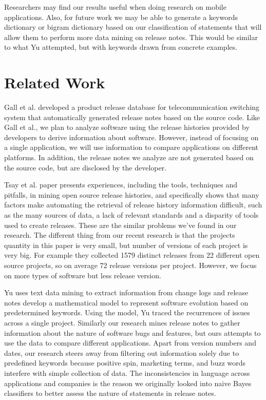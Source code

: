 \documentclass{acm_proc_article-sp}
\begin{document}
 Researchers may find our results useful when doing research on mobile applications.
Also, for future work we may be able to generate a keywords dictionary or bigram dictionary based on our classification of statements that will allow them to perform more data mining on release notes.
This would be similar to what Yu \cite{YuChangeLogs} attempted, but with keywords drawn from concrete examples.


\section{Related Work}

Gall et al. \cite{GallSoftwareEv} developed a product release database for telecommunication switching system that automatically generated release notes based on the source code.
Like Gall et al., we plan to analyze software using the release histories provided by developers to derive information about software. 
However, instead of focusing on a single application, we will use information to compare applications on different platforms. 
In addition, the release notes we analyze are not generated based on the source code, but are disclosed by the developer.

Tsay et al. \cite{TsayOpenSourceMining} paper presents experiences, including the tools, techniques and pitfalls, in mining open source release histories, and specifically shows that many factors make automating the retrieval of release history information difficult, such as the many sources of data, a lack of relevant standards and a disparity of tools used to create releases. These are the similar problems we've found in our research.
The different thing from our recent research is that the projects quantity in this paper is very small, but number of versions of each project is very big. For example they collected 1579 distinct releases from 22 different open source projects, so on average 72 release versions per project. However, we focus on more types of software but less release version.

Yu \cite{YuChangeLogs} uses text data mining to extract information from change logs and release notes develop a mathematical model to represent software evolution based on predetermined keywords. Using the model, Yu traced the recurrences of issues across a single project.
Similarly our research mines release notes to gather information about the nature of software bugs and features, but ours attempts to use the data to compare different applications. 
Apart from version numbers and dates, our research steers away from filtering out information solely due to predefined keywords because positive spin, marketing terms, and buzz words interfere with simple collection of data. 
The inconsistencies in language across applications and companies is the reason we originally looked into naive Bayes classifiers to better assess the nature of statements in release notes.
\end{document}

